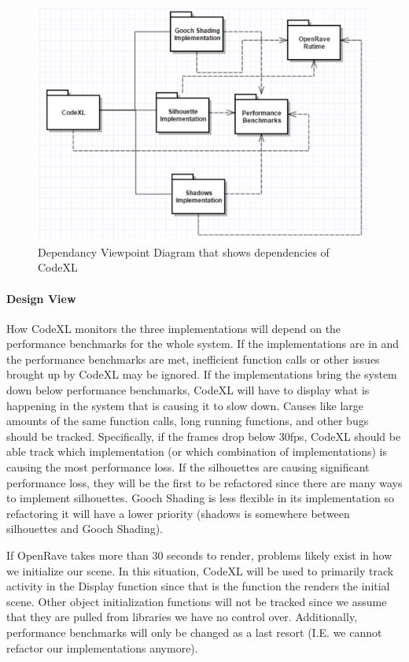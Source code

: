 \begin{flushleft}
\begin{figure} [H]
  \includegraphics[scale=0.9]{designdoc_v1/CodeXL_Dependency.eps}
  \caption
{ \newline \hspace{\linewidth}
Dependancy Viewpoint Diagram that shows dependencies of CodeXL}
  \label{fig:CodeXL_Dependency}
\end{figure}

\paragraph{Design View}
How CodeXL monitors the three implementations will depend on the performance benchmarks for the whole system.
If the implementations are in and the performance benchmarks are met, inefficient function calls or other issues brought up by CodeXL may be ignored.
If the implementations bring the system down below performance benchmarks, CodeXL will have to display what is happening in the system that is causing it to slow down.
Causes like large amounts of the same function calls, long running functions, and other bugs should be tracked.
Specifically, if the frames drop below 30fps, CodeXL should be able track which implementation (or which combination of implementations) is causing the most performance loss.
If the silhouettes are causing significant performance loss, they will be the first to be refactored since there are many ways to implement silhouettes. 
Gooch Shading is less flexible in its implementation so refactoring it will have a lower priority (shadows is somewhere between silhouettes and Gooch Shading).

If OpenRave takes more than 30 seconds to render, problems likely exist in how we initialize our scene.
In this situation, CodeXL will be used to primarily track activity in the Display function since that is the function the renders the initial scene.
Other object initialization functions will not be tracked since we assume that they are pulled from libraries we have no control over.
Additionally, performance benchmarks will only be changed as a last resort (I.E. we cannot refactor our implementations anymore).


\end{flushleft}
